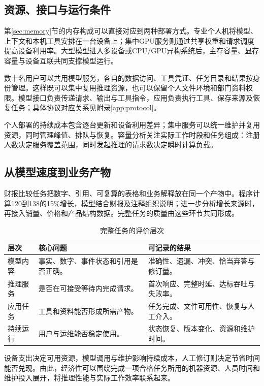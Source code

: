 \subsection{资源、接口与运行条件}
第\ref{sec:memory}节的内存构成可以直接对应到两种部署方式。专业个人机将模型、上下文和本机工具安排在一台设备上；集中GPU服务则通过共享权重和请求调度提高设备利用率。大型模型进入多设备或CPU/GPU异构系统后，主存容量、显存容量与设备互联共同支撑模型运行。

数十名用户可以共用模型服务，各自的数据访问、工具凭证、任务目录和结果按身份管理。这样既可以集中复用推理资源，也可以保留个人文件环境和部门资料权限。模型接口负责传递请求、输出与工具指令，应用负责执行工具、保存来源及恢复任务；具体协议对应关系见附录\ref{app:protocol}。

个人部署的持续成本包含逐台更新和设备利用差异；集中服务可以统一维护并复用资源，同时管理峰值、排队与恢复。容量分析关注实际工作时段和任务组成：注册人数决定服务覆盖范围，同时发起推理的请求数决定瞬时计算负载。

\subsection{从模型速度到业务产物}
财报比较任务把数字、引用、可复算的表格和业务解释放在同一个产物中。程序计算120到138的15\%增长，模型结合财报及注释组织说明；进一步分析增长来源时，再接入销量、价格和产品结构数据。完整任务的质量由这些环节共同形成。

\begin{table}[H]\small\centering
\caption{完整任务的评价层次}
\begin{tabularx}{\linewidth}{@{}P{29mm}Y Y@{}}\toprule
层次 & 核心问题 & 可记录的结果\\\midrule
模型内容 & 事实、数字、事件状态和引用是否正确。 & 准确性、遗漏、冲突、恰当弃答与修订量。\\
推理服务 & 是否在可接受等待内完成请求。 & 首次响应、完整时延、达标吞吐与失败率。\\
应用任务 & 工具和资料能否形成所需产物。 & 任务完成、文件可用性、恢复与人工介入。\\
持续运行 & 用户与运维能否稳定使用。 & 状态恢复、版本变化、资源和维护时间。\\\bottomrule
\end{tabularx}
\end{table}

设备支出决定可用资源，模型调用与维护影响持续成本，人工修订则决定节省时间能否兑现。由此，经济性可以围绕完成一项合格任务所用的机器资源、人员时间和维护投入展开，将推理性能与实际工作效率联系起来。

